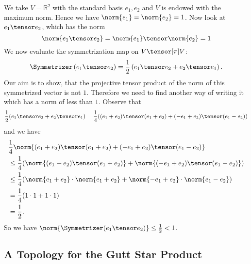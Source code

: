 \begin{example}
	We take $V = \mathbb{R}^2$ with the standard basis $e_1,	e_2$ 
	and $V$ is endowed with the maximum norm. Hence we have $\norm{e_1} = 
	\norm{e_2} = 1$. Now look at $e_1 \tensor e_2$, which has the norm
	\begin{equation*}
		\norm{
			e_1 \tensor e_2
		}
		= 
		\norm{e_1}
		\tensor
		\norm{e_2}
		=
		1
	\end{equation*}
	We now evaluate the symmetrization map on $V \tensor[\pi] V$:
	\begin{equation*}
		\Symmetrizer \left(
			e_1 \tensor e_2
		\right)
		=
		\frac{1}{2}
		\left(
			e_1 \tensor e_2
			+
			e_2 \tensor e_1
		\right).
	\end{equation*}
	Our aim is to show, that the projective tensor product of the norm of this 
	symmetrized vector is not $1$. Therefore we need to find another way of 
	writing it which has a norm of less than $1$. Observe that
	\begin{equation*}
		\frac{1}{2}
		(e_1 \tensor e_2 + e_2 \tensor e_1)
		=
		\frac{1}{4}
		(
			(e_1 + e_2) \tensor (e_1 + e_2)
			+
			(-e_1 + e_2) \tensor (e_1 - e_2)
		)
	\end{equation*}
	and we have
	\begin{align*}
		& 
		\frac{1}{4}
		\norm{
			(e_1 + e_2) \tensor (e_1 + e_2)
			+
			(-e_1 + e_2) \tensor (e_1 - e_2)
		}
		\\
		& \leq
		\frac{1}{4}
		(
			\norm{ (e_1 + e_2) \tensor (e_1 + e_2) }
			+
			\norm{ (-e_1 + e_2) \tensor (e_1 - e_2) }
		)
		\\
		& \leq
		\frac{1}{4}
		(
			\norm{e_1 + e_2}
			\cdot
			\norm{e_1 + e_2}
			+
			\norm{- e_1 + e_2}
			\cdot
			\norm{e_1 - e_2}
		)
		\\
		& =
		\frac{1}{4}
		(1 \cdot 1 + 1 \cdot 1)
		\\
		& =
		\frac{1}{2}.
	\end{align*}
	So we have $\norm{\Symmetrizer(e_1 \tensor e_2)} \leq \frac{1}{2} < 1$.
\end{example}


\subsection{A Topology for the Gutt Star Product}

